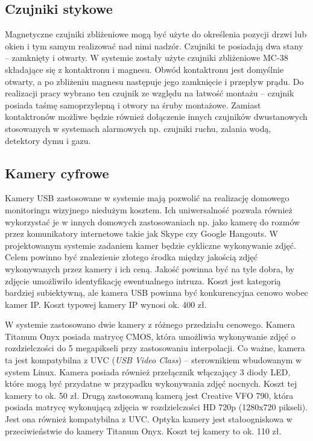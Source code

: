 \documentclass[a4paper,11pt,twoside]{article}
\begin{document}
\subsection{Czujniki stykowe}
Magnetyczne czujniki zbliżeniowe mogą być użyte do określenia pozycji drzwi lub okien i tym samym realizować nad nimi nadzór. Czujniki te posiadają dwa stany -- zamknięty i otwarty. W systemie zostały użyte czujniki zbliżeniowe MC-38 składające się z kontaktronu i magnesu. Obwód kontaktronu jest domyślnie otwarty, a po zbliżeniu magnesu następuje jego zamknięcie i przepływ prądu. Do realizacji pracy wybrano ten czujnik ze względu na łatwość montażu -- czujnik posiada taśmę samoprzylepną i otwory na śruby montażowe. Zamiast kontaktronów możliwe będzie również dołączenie innych czujników dwustanowych stosowanych w systemach alarmowych np. czujniki ruchu, zalania wodą, detektory dymu i gazu.

\subsection{Kamery cyfrowe}
Kamery USB zastosowane w systemie mają pozwolić na realizację domowego monitoringu wizyjnego niedużym kosztem. Ich uniwersalność pozwala również wykorzystać je w innych domowych zastosowaniach np. jako kamerę do rozmów przez komunikatory internetowe takie jak Skype czy Google Hangouts. W projektowanym systemie zadaniem kamer będzie cykliczne wykonywanie zdjęć. Celem powinno być znalezienie złotego środka między jakością zdjęć wykonywanych przez kamery i ich ceną. Jakość powinna być na tyle dobra, by zdjęcie umożliwiło identyfikację ewentualnego intruza. Koszt jest kategorią bardziej subiektywną, ale kamera USB powinna być konkurencyjna cenowo wobec kamer IP. Koszt typowej kamery IP wynosi ok. 400 zł.\cite{komputer_świat}

W systemie zastosowano dwie kamery z różnego przedziału cenowego. Kamera Titanum Onyx posiada matrycę CMOS, która umożliwia wykonywanie zdjęć o rozdzielczości do 5 megapikseli przy zastosowaniu interpolacji. Co ważne, kamera ta jest kompatybilna z UVC (\textit{USB Video Class}) -- sterownikiem wbudowanym w system Linux. Kamera posiada również przełącznik włączający 3 diody LED, które mogą być przydatne w przypadku wykonywania zdjęć nocnych. Koszt tej kamery to ok. 50 zł. Drugą zastosowaną kamerą jest Creative VFO 790, która posiada matrycę wykonującą zdjęcia w rozdzielczości HD 720p (1280x720 pikseli). Jest ona również kompatybilna z UVC. Optyka kamery jest stałoogniskowa w przeciwieństwie do kamery Titanum Onyx. Koszt tej kamery to ok. 110 zł.
\end{document}
